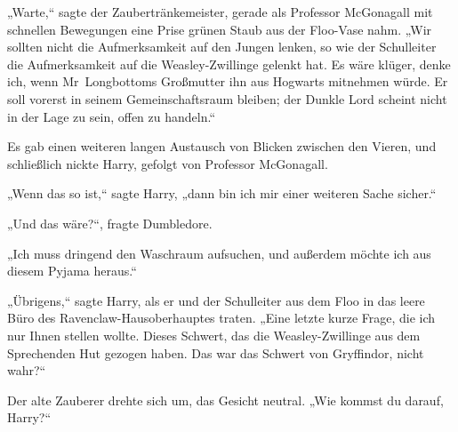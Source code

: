 „Warte,“ sagte der Zaubertränkemeister, gerade als Professor McGonagall mit schnellen Bewegungen eine Prise grünen Staub aus der Floo-Vase nahm.
„Wir sollten nicht die Aufmerksamkeit auf den Jungen lenken, so wie der Schulleiter die Aufmerksamkeit auf die Weasley-Zwillinge gelenkt hat. Es wäre klüger, denke ich, wenn Mr~Longbottoms Großmutter ihn aus Hogwarts mitnehmen würde. Er soll vorerst in seinem Gemeinschaftsraum bleiben; der Dunkle Lord scheint nicht in der Lage zu sein, offen zu handeln.“

Es gab einen weiteren langen Austausch von Blicken zwischen den Vieren, und schließlich nickte Harry, gefolgt von Professor McGonagall.

„Wenn das so ist,“ sagte Harry, „dann bin ich mir einer weiteren Sache sicher.“

„Und das wäre?“, fragte Dumbledore.

„Ich muss dringend den Waschraum aufsuchen, und außerdem möchte ich aus diesem Pyjama heraus.“

\later

„Übrigens,“ sagte Harry, als er und der Schulleiter aus dem Floo in das leere Büro des Ravenclaw-Hausoberhauptes traten.
„Eine letzte kurze Frage, die ich nur Ihnen stellen wollte. Dieses Schwert, das die Weasley-Zwillinge aus dem Sprechenden Hut gezogen haben. Das war das Schwert von Gryffindor, nicht wahr?“

Der alte Zauberer drehte sich um, das Gesicht neutral.
„Wie kommst du darauf, Harry?“

